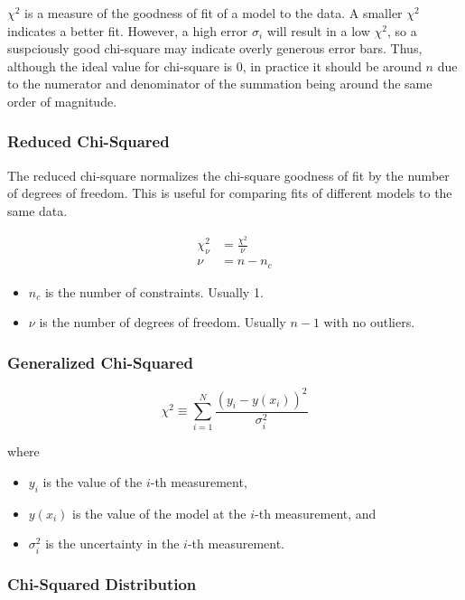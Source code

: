 $\chi^2$ is a measure of the goodness of fit of a model to the data. A smaller $\chi^2$ indicates a better fit. However, a high error $\sigma_i$ will result in a low $\chi^2$, so a suspciously good chi-square may indicate overly generous error bars. Thus, although the ideal value for chi-square is 0, in practice it should be around $n$ due to the numerator and denominator of the summation being around the same order of magnitude.

\subsubsection{Reduced Chi-Squared}

The reduced chi-square normalizes the chi-square goodness of fit by the number of degrees of freedom. This is useful for comparing fits of different models to the same data.

\begin{align*}
    \chi^2_\nu & = \frac{\chi^2}{\nu} \\
    \nu        & = n - n_c
\end{align*}

\begin{itemize}
    \item $n_c$ is the number of constraints. Usually 1.
    \item $\nu$ is the number of degrees of freedom. Usually $n - 1$ with no outliers.
\end{itemize}

\subsubsection{Generalized Chi-Squared}

\begin{equation*}
    \chi^2 \equiv \sum_{i=1}^N \frac{(y_i - y(x_i))^2}{\sigma_i^2}
\end{equation*}

where

\begin{itemize}
    \item $y_i$ is the value of the $i$-th measurement,
    \item $y(x_i)$ is the value of the model at the $i$-th measurement, and
    \item $\sigma_i^2$ is the uncertainty in the $i$-th measurement.
\end{itemize}

\subsubsection{Chi-Squared Distribution}

